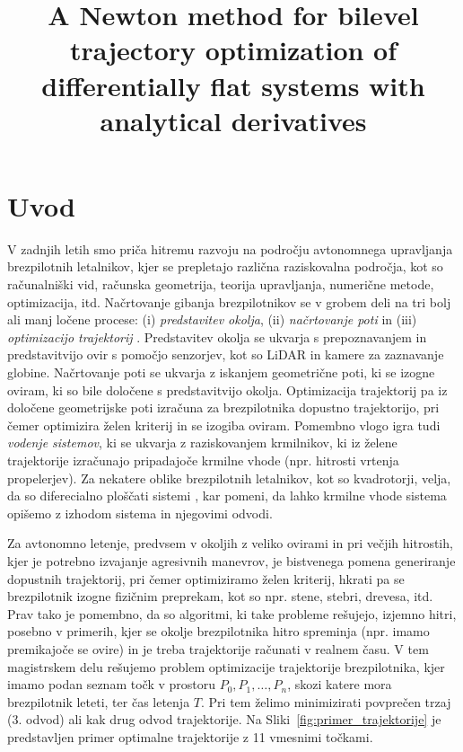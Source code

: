 \documentclass[mat2, tisk]{fmfdelo}
\title{A Newton method for bilevel trajectory optimization of differentially flat systems with analytical derivatives}
\begin{document}
\section{Uvod}

V zadnjih letih smo priča hitremu razvoju na področju avtonomnega upravljanja brezpilotnih letalnikov, kjer se prepletajo različna raziskovalna področja, kot so računalniški vid, računska geometrija, teorija upravljanja, numerične metode, optimizacija, itd.  Načrtovanje gibanja brezpilotnikov se v grobem deli na tri bolj ali manj ločene procese: (i) \textit{predstavitev okolja}, (ii) \textit{načrtovanje poti} in (iii) \textit{optimizacijo trajektorij} \cite{zhou2025survey}. Predstavitev okolja se ukvarja s prepoznavanjem in predstavitvijo ovir s pomočjo senzorjev, kot so LiDAR in kamere za zaznavanje globine. Načrtovanje poti se ukvarja z iskanjem geometrične poti, ki se izogne oviram, ki so bile določene s  predstavitvijo okolja. Optimizacija trajektorij pa iz določene geometrijske poti izračuna za brezpilotnika dopustno trajektorijo, pri čemer optimizira želen kriterij in se izogiba oviram. Pomembno vlogo igra tudi \textit{vodenje sistemov}, ki se ukvarja z raziskovanjem krmilnikov, ki iz želene trajektorije izračunajo pripadajoče krmilne vhode (npr. hitrosti vrtenja propelerjev). Za nekatere oblike brezpilotnih letalnikov, kot so kvadrotorji, velja, da so diferecialno ploščati sistemi \cite{mellinger2011minimum}, kar pomeni, da lahko krmilne vhode sistema opišemo z izhodom sistema in njegovimi odvodi.

Za avtonomno letenje, predvsem v okoljih z veliko ovirami in pri večjih hitrostih, kjer je potrebno izvajanje agresivnih manevrov, je bistvenega pomena generiranje dopustnih trajektorij, pri čemer optimiziramo želen kriterij, hkrati pa se brezpilotnik izogne fizičnim preprekam, kot so npr. stene, stebri, drevesa, itd. Prav tako je pomembno, da so algoritmi, ki take probleme rešujejo, izjemno hitri, posebno v primerih, kjer se okolje brezpilotnika hitro spreminja (npr. imamo premikajoče se ovire) in je treba trajektorije računati v realnem času. 
V tem magistrskem delu rešujemo problem optimizacije trajektorije brezpilotnika, kjer imamo podan seznam točk v prostoru $P_0, P_1, \ldots, P_n$, skozi katere mora brezpilotnik leteti, ter čas letenja $T$. Pri tem želimo minimizirati povprečen trzaj (3. odvod) ali kak drug odvod trajektorije. Na Sliki~\ref{fig:primer_trajektorije} je predstavljen primer optimalne trajektorije z 11 vmesnimi točkami.
\end{document}
